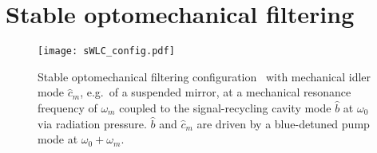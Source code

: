 \section{Stable optomechanical filtering}
\label{sec:sWLC}

\begin{figure}[ht]
	\centering
	\texttt{[image: sWLC\_config.pdf]}
	\caption{ Stable optomechanical filtering configuration~\cite{liEnhancingInterferometerSensitivity2021} with mechanical idler mode $\hat{c}_m$, e.g.\ of a suspended mirror, at a mechanical resonance frequency of $\omega_m$ coupled to the signal-recycling cavity mode $\hat b$ at $\omega_0$ via radiation pressure. $\hat b$ and $\hat{c}_m$ are driven by a blue-detuned pump mode at $\omega_0+\omega_m$.}
	\label{fig:sWLC_config}
\end{figure}




